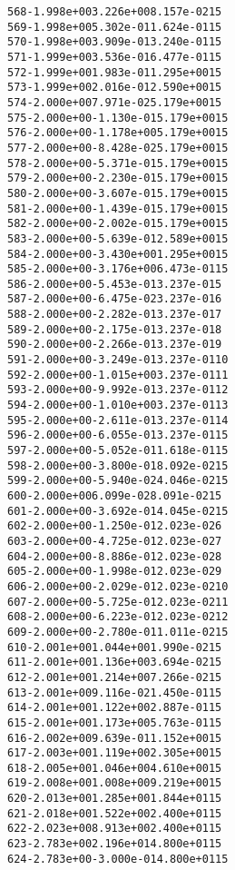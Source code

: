 \begin{alltt}
 568  -1.998e+00   3.226e+00   8.157e-02   15
 569  -1.998e+00   5.302e-01   1.624e-01   15
 570  -1.998e+00   3.909e-01   3.240e-01   15
 571  -1.999e+00   3.536e-01   6.477e-01   15
 572  -1.999e+00   1.983e-01   1.295e+00   15
 573  -1.999e+00   2.016e-01   2.590e+00   15
 574  -2.000e+00   7.971e-02   5.179e+00   15
 575  -2.000e+00  -1.130e-01   5.179e+00   15
 576  -2.000e+00  -1.178e+00   5.179e+00   15
 577  -2.000e+00  -8.428e-02   5.179e+00   15
 578  -2.000e+00  -5.371e-01   5.179e+00   15
 579  -2.000e+00  -2.230e-01   5.179e+00   15
 580  -2.000e+00  -3.607e-01   5.179e+00   15
 581  -2.000e+00  -1.439e-01   5.179e+00   15
 582  -2.000e+00  -2.002e-01   5.179e+00   15
 583  -2.000e+00  -5.639e-01   2.589e+00   15
 584  -2.000e+00  -3.430e+00   1.295e+00   15
 585  -2.000e+00  -3.176e+00   6.473e-01   15
 586  -2.000e+00  -5.453e-01   3.237e-01    5
 587  -2.000e+00  -6.475e-02   3.237e-01    6
 588  -2.000e+00  -2.282e-01   3.237e-01    7
 589  -2.000e+00  -2.175e-01   3.237e-01    8
 590  -2.000e+00  -2.266e-01   3.237e-01    9
 591  -2.000e+00  -3.249e-01   3.237e-01   10
 592  -2.000e+00  -1.015e+00   3.237e-01   11
 593  -2.000e+00  -9.992e-01   3.237e-01   12
 594  -2.000e+00  -1.010e+00   3.237e-01   13
 595  -2.000e+00  -2.611e-01   3.237e-01   14
 596  -2.000e+00  -6.055e-01   3.237e-01   15
 597  -2.000e+00  -5.052e-01   1.618e-01   15
 598  -2.000e+00  -3.800e-01   8.092e-02   15
 599  -2.000e+00  -5.940e-02   4.046e-02   15
 600  -2.000e+00   6.099e-02   8.091e-02   15
 601  -2.000e+00  -3.692e-01   4.045e-02   15
 602  -2.000e+00  -1.250e-01   2.023e-02    6
 603  -2.000e+00  -4.725e-01   2.023e-02    7
 604  -2.000e+00  -8.886e-01   2.023e-02    8
 605  -2.000e+00  -1.998e-01   2.023e-02    9
 606  -2.000e+00  -2.029e-01   2.023e-02   10
 607  -2.000e+00  -5.725e-01   2.023e-02   11
 608  -2.000e+00  -6.223e-01   2.023e-02   12
 609  -2.000e+00  -2.780e-01   1.011e-02   15
 610  -2.001e+00   1.044e+00   1.990e-02   15
 611  -2.001e+00   1.136e+00   3.694e-02   15
 612  -2.001e+00   1.214e+00   7.266e-02   15
 613  -2.001e+00   9.116e-02   1.450e-01   15
 614  -2.001e+00   1.122e+00   2.887e-01   15
 615  -2.001e+00   1.173e+00   5.763e-01   15
 616  -2.002e+00   9.639e-01   1.152e+00   15
 617  -2.003e+00   1.119e+00   2.305e+00   15
 618  -2.005e+00   1.046e+00   4.610e+00   15
 619  -2.008e+00   1.008e+00   9.219e+00   15
 620  -2.013e+00   1.285e+00   1.844e+01   15
 621  -2.018e+00   1.522e+00   2.400e+01   15
 622  -2.023e+00   8.913e+00   2.400e+01   15
 623  -2.783e+00   2.196e+01   4.800e+01   15
 624  -2.783e+00  -3.000e-01   4.800e+01   15

\end{alltt}

